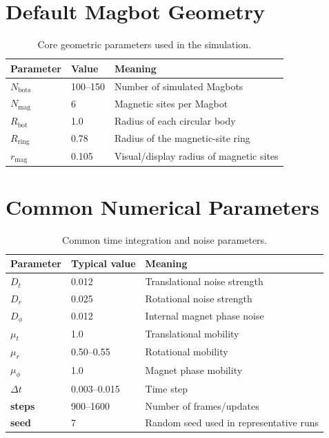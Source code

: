 \documentclass[12pt,a4paper,oneside]{report}
\begin{document}
\section{Default Magbot Geometry}
\begin{table}[H]
\centering
\caption{Core geometric parameters used in the simulation.}
\begin{tabularx}{0.88\textwidth}{>{\bfseries}p{4.0cm}p{3.0cm}X}
\toprule
Parameter & Value & Meaning \\
\midrule
$N_{\mathrm{bots}}$ & 100--150 & Number of simulated Magbots \\
$N_{\mathrm{mag}}$ & 6 & Magnetic sites per Magbot \\
$R_{\mathrm{bot}}$ & 1.0 & Radius of each circular body \\
$R_{\mathrm{ring}}$ & 0.78 & Radius of the magnetic-site ring \\
$r_{\mathrm{mag}}$ & 0.105 & Visual/display radius of magnetic sites \\
\bottomrule
\end{tabularx}
\end{table}

\section{Common Numerical Parameters}
\begin{table}[H]
\centering
\caption{Common time integration and noise parameters.}
\begin{tabularx}{0.88\textwidth}{>{\bfseries}p{4.0cm}p{3.0cm}X}
\toprule
Parameter & Typical value & Meaning \\
\midrule
$D_t$ & 0.012 & Translational noise strength \\
$D_r$ & 0.025 & Rotational noise strength \\
$D_\phi$ & 0.012 & Internal magnet phase noise \\
$\mu_t$ & 1.0 & Translational mobility \\
$\mu_r$ & 0.50--0.55 & Rotational mobility \\
$\mu_\phi$ & 1.0 & Magnet phase mobility \\
$\Delta t$ & 0.003--0.015 & Time step \\
steps & 900--1600 & Number of frames/updates \\
seed & 7 & Random seed used in representative runs \\
\bottomrule
\end{tabularx}
\end{table}
\end{document}
